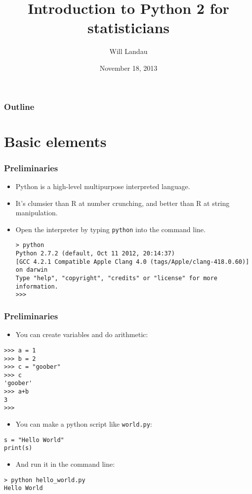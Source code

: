 \documentclass[handout]{beamer}
\title{Introduction to Python 2 for statisticians}
\author{Will Landau}
\date{November 18, 2013}
\institute{Iowa State University}
\numberwithin{equation}{section}
\begin{document}
\begin{frame}
\titlepage
 \end{frame}
 
 \begin{frame}
\frametitle{Outline}
\tableofcontents
\end{frame}
 

\section{Basic elements}

\begin{frame}[fragile]
\frametitle{Preliminaries}
\begin{itemize}
\item Python is a high-level multipurpose interpreted language. 
\pause \item It's clumsier than R at number crunching, and better than R at string manipulation.
\pause \item Open the interpreter by typing {\tt python} into the command line.
\begin{lstlisting}[name=ex]
> python
Python 2.7.2 (default, Oct 11 2012, 20:14:37) 
[GCC 4.2.1 Compatible Apple Clang 4.0 (tags/Apple/clang-418.0.60)] on darwin
Type "help", "copyright", "credits" or "license" for more information.
>>> 
\end{lstlisting}
\end{itemize}
\end{frame}

\begin{frame}[fragile]
\frametitle{Preliminaries}
\begin{itemize}
\item You can create variables and do arithmetic:
\end{itemize}
\begin{lstlisting}[name=ex]
>>> a = 1
>>> b = 2
>>> c = "goober"
>>> c
'goober'
>>> a+b
3
>>> 
\end{lstlisting}
\begin{itemize}
\pause \item You can make a python script like {\tt world.py}:
\end{itemize}
\begin{lstlisting}[name=ex]
s = "Hello World"
print(s)
\end{lstlisting}
\begin{itemize}
\pause \item And run it in the command line:
\end{itemize}
\begin{lstlisting}[name=ex]
> python hello_world.py
Hello World
\end{lstlisting}
\end{frame}
\end{document}
